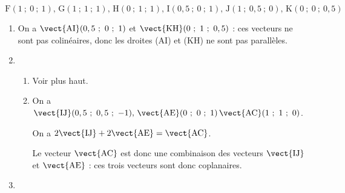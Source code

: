\[\, \text{F}(1~;~0~;~1),\, \text{G}(1~;~1~;~1),\, \text{H}(0~;~1~;~1),\, \text{I}(0,5~;~0~;~1),\, \text{J}(1~;~0,5~;~0),\, \text{K}(0~;~0~;~0,5)\]
\begin{enumerate}
\item %

On a $\vect{\text{AI}}(0,5~;~0~;~1)$ et $\vect{\text{KH}}(0~;~1~;~0,5)$ : ces vecteurs ne sont pas colinéaires, donc les droites (AI) et (KH) ne sont pas parallèles.

\item 
	\begin{enumerate}
		\item %
Voir plus haut.
		\item %
On a $\vect{\text{IJ}}(0,5~;~0,5~;~-1), \, \vect{\text{AE}}(0~;~0~;~1)\, \vect{\text{AC}}(1~;~1~;~0)$.

On a $2\vect{\text{IJ}} + 2\vect{\text{AE}} = \vect{\text{AC}}$.

Le vecteur $\vect{\text{AC}}$ est donc une combinaison des vecteurs $\vect{\text{IJ}}$ et $\vect{\text{AE}}$ : ces trois vecteurs sont donc coplanaires.
	\end{enumerate}
	
%
%
\item %


\end{enumerate}
